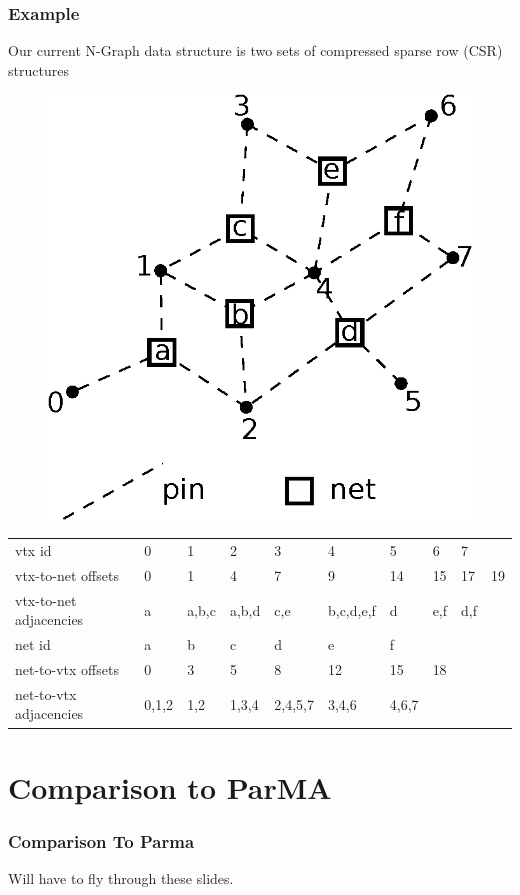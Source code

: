 \documentclass{beamer}
\begin{document}
\begin{frame}
  \frametitle{Example}
  Our current N-Graph data structure is two sets of compressed sparse row (CSR)
  structures
  \begin{figure}
    \centering
    \includegraphics[width=.4\textwidth]{figures/hypergraph.eps}
  \end{figure}  
  {\tiny
  \begin{table}[]
    \centering
    \label{my-label}
    \begin{tabular}{llllllllll}
      vtx id                 & 0     & 1     & 2     & 3       & 4         & 5     & 6   & 7   &    \\
      vtx-to-net offsets     & 0     & 1     & 4     & 7       & 9         & 14    & 15  & 17  & 19 \\
      vtx-to-net adjacencies & a     & a,b,c & a,b,d & c,e     & b,c,d,e,f & d     & e,f & d,f &    \\
      net id                 & a     & b     & c     & d       & e         & f     &     &     &    \\
      net-to-vtx offsets     & 0     & 3     & 5     & 8       & 12        & 15    & 18  &     &    \\
      net-to-vtx adjacencies & 0,1,2 & 1,2   & 1,3,4 & 2,4,5,7 & 3,4,6     & 4,6,7 &     &     &   
    \end{tabular}
  \end{table}
  }
\end{frame}

\section{Comparison to ParMA}

\begin{frame}
  \frametitle{Comparison To Parma}
  Will have to fly through these slides.
\end{frame}
\end{document}
